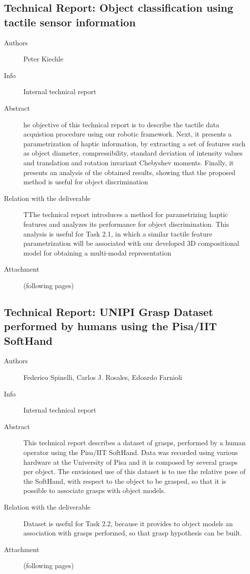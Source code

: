 \documentclass[a4paper,11pt,pdf]{pacmanreport}
\begin{document}
\subsection{Technical Report: Object classification using tactile sensor information} \label{ann:techReportKiechle}
\begin{description}
\item[Authors] Peter Kiechle
\item[Info] Internal technical report
\item[Abstract] he objective of this technical report is to describe the 
tactile data acquistion procedure using our robotic framework. Next, it presents 
a parametrization of haptic information, by extracting a set of features such as 
object diameter, compressibility, standard deviation of intensity values and 
translation and rotation invariant Chebyshev moments. Finally, it presents an 
analysis of the obtained results, showing that the proposed method is useful for 
object discrimination
\item[Relation with the deliverable] TThe technical report introduces a method for parametrizing haptic features and 
analyzes its performance for object discrimination. This analysis is useful for 
Task 2.1, in which a similar tactile feature parametrization will be associated 
with our developed 3D compositional model for obtaining a multi-modal 
representation
\item[Attachment] (following pages)
\end{description}


\subsection{Technical Report: UNIPI Grasp Dataset performed by humans using the Pisa/IIT SoftHand} \label{ann:techReportFederico}
\begin{description}
\item[Authors] Federico Spinelli, Carlos J. Rosales, Edoardo Farnioli
\item[Info] Internal technical report
\item[Abstract] This technical report describes a dataset of grasps, performed by a human operator 
  using the Pisa/IIT SoftHand. Data was recorded using various hardware at
the University of Pisa and it is composed by several grasps per object. The envisioned 
use of this dataset is to use the relative pose of the SoftHand, with respect to the object to
be grasped, so that it is possible to associate grasps with object models.
\item[Relation with the deliverable] Dataset is useful for Task 2.2, because it provides 
  to object models an association with grasps performed, so that grasp hypothesis can be built. 
\item[Attachment] (following pages)
\end{description}

\end{document}
